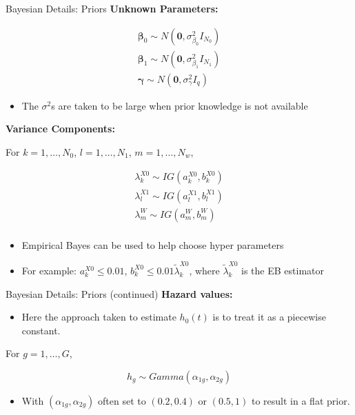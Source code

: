 \documentclass[
  ignorenonframetext,
]{beamer}
\providecommand{\tightlist}{%
  \setlength{\itemsep}{0pt}\setlength{\parskip}{0pt}}
\begin{document}
\begin{frame}{Bayesian Details: Priors}
\protect\hypertarget{bayesian-details-priors}{}
\textbf{Unknown Parameters:}

\[
\begin{aligned}
\boldsymbol{\beta}_0 \sim N(\boldsymbol{0}, \sigma^2_{\beta_0}I_{N_0}) \\
\boldsymbol{\beta}_1 \sim N(\boldsymbol{0}, \sigma^2_{\beta_1}I_{N_1}) \\
\boldsymbol{\gamma} \sim N(\boldsymbol{0}, \sigma^2_{\gamma}I_{q})
\end{aligned}
\]

\begin{itemize}
\tightlist
\item
  The \(\sigma^2\)s are taken to be large when prior knowledge is not
  available
\end{itemize}

\textbf{Variance Components:}

For \(k = 1, \ldots, N_0\), \(l = 1, \ldots, N_1\),
\(m = 1, \ldots, N_w\),

\[
\begin{aligned}
\lambda_k^{X0} \sim IG(a_k^{X0}, b_k^{X0}) \\
\lambda_l^{X1} \sim IG(a_l^{X1}, b_l^{X1}) \\
\lambda_m^{W} \sim IG(a_m^{W}, b_m^{W}) \\
\end{aligned}
\]

\begin{itemize}
\tightlist
\item
  Empirical Bayes can be used to help choose hyper parameters
\item
  For example: \(a_k^{X0} \leq 0.01\),
  \(b_k^{X0} \leq 0.01\tilde{\lambda}_k^{X0}\), where
  \(\tilde{\lambda}_k^{X0}\) is the EB estimator
\end{itemize}
\end{frame}

\begin{frame}{Bayesian Details: Priors (continued)}
\protect\hypertarget{bayesian-details-priors-continued}{}
\textbf{Hazard values:}

\begin{itemize}
\tightlist
\item
  Here the approach taken to estimate \(h_0(t)\) is to treat it as a
  piecewise constant.
\end{itemize}

For \(g = 1, \ldots, G\),

\[
h_g \sim Gamma(\alpha_{1g}, \alpha_{2g})
\]

\begin{itemize}
\tightlist
\item
  With \((\alpha_{1g}, \alpha_{2g})\) often set to \((0.2, 0.4)\) or
  \((0.5, 1)\) to result in a flat prior.
\end{itemize}
\end{frame}
\end{document}
